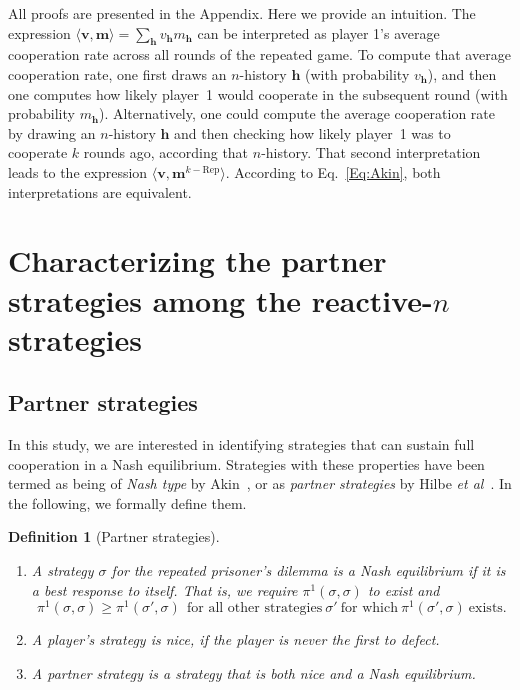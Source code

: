 \documentclass[11pt]{article}
\theoremstyle{plainCl1}
\theoremstyle{plainCl2}
\newtheorem*{definition}{Definition}
\begin{document}

\noindent
All proofs are presented in the Appendix. Here we provide an intuition.
The expression $\langle \mathbf{v}, \mathbf{m} \rangle \!=\! \sum_\mathbf{h} v_\mathbf{h}m_\mathbf{h}$ can be interpreted as player 1's average cooperation rate across all rounds of the repeated game.
To compute that average cooperation rate, one first draws an $n$-history $\mathbf{h}$ (with probability $v_\mathbf{h}$), and then one computes how likely player~1 would cooperate in the subsequent round (with probability $m_\mathbf{h}$). 
Alternatively, one could compute the average cooperation rate by drawing an $n$-history $\mathbf{h}$ and then checking how likely player~1 was to cooperate $k$ rounds ago, according that $n$-history. 
That second interpretation leads to the expression $\langle \mathbf{v}, \mathbf{m}^{k-\text{Rep}} \rangle$. 
According to Eq.~\eqref{Eq:Akin}, both interpretations are equivalent.\\






\section{Characterizing the partner strategies among the reactive-$n$ strategies}
\label{section:results}

\subsection{Partner strategies}

In this study, we are interested in identifying strategies that can sustain full cooperation in a Nash equilibrium. 
Strategies with these properties have been termed as being of {\it Nash type} by Akin~\citep{akin:EGADS:2016}, or as {\it partner strategies} by Hilbe {\it et al}~\citep{Hilbe:GEB:2015}. 
In the following, we formally define them. 

\begin{definition}[Partner strategies]
~\\[-1cm]
{
\renewcommand\labelenumi{(\roman{enumi})}
\begin{enumerate}[noitemsep,topsep=0pt]
\item A strategy $\sigma$ for the repeated prisoner's dilemma is a {\it Nash equilibrium} if it is a best response to itself. 
That is, we require $\pi^1(\sigma,\sigma)$ to exist and
\begin{equation} \label{Eq:NashCondition}
\pi^1(\sigma,\sigma) \!\ge\! \pi^1(\sigma',\sigma) ~~\text{for all other strategies}~\sigma'~\text{for which}~ \pi^1(\sigma',\sigma)~\text{exists}. 
\end{equation}
\item A player's strategy is \textit{nice}, if the player is never the first to defect. 
\item A \textit{partner strategy} is a strategy that is both nice and a Nash equilibrium.
\end{enumerate}
}
\end{definition}
\end{document}
